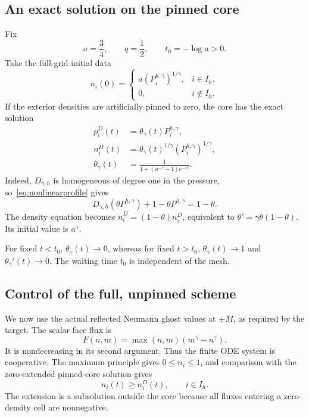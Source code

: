 \documentclass[11pt,a4paper]{article}
\theoremstyle{remark}
\begin{document}
\subsection{An exact solution on the pinned core}

Fix
\[
 a=\frac34,\qquad q=\frac12,\qquad t_0=-\log a>0.
\]
Take the full-grid initial data
\begin{equation}\label{eq:abinitial}
 n_i(0)=
 \begin{cases}
 a(P_i^{h,\gamma})^{1/\gamma},&i\in I_h,\\
 0,&i\notin I_h.
 \end{cases}
\end{equation}
If the exterior densities are artificially pinned to zero, the core has the exact solution
\begin{align}
 p_i^D(t)&=\theta_\gamma(t)P_i^{h,\gamma},\label{eq:corepressure}\\
 n_i^D(t)&=\theta_\gamma(t)^{1/\gamma}(P_i^{h,\gamma})^{1/\gamma},\label{eq:coredensity}\\
 \theta_\gamma(t)&=\frac1{1+(a^{-\gamma}-1)e^{-\gamma t}}.
 \label{eq:theta}
\end{align}
Indeed, $D_{\gamma,h}$ is homogeneous of degree one in the pressure, so~\eqref{eq:nonlinearprofile} gives
\[
 D_{\gamma,h}(\theta P^{h,\gamma})+1-\theta P^{h,\gamma}=1-\theta.
\]
The density equation becomes $\dot n_i^D=(1-\theta)n_i^D$, equivalent to $\theta'=\gamma\theta(1-\theta)$. Its initial value is $a^\gamma$.

For fixed $t<t_0$, $\theta_\gamma(t)\to0$, whereas for fixed $t>t_0$, $\theta_\gamma(t)\to1$ and $\theta_\gamma'(t)\to0$. The waiting time $t_0$ is independent of the mesh.

\subsection{Control of the full, unpinned scheme}

We now use the actual reflected Neumann ghost values at $\pm M$, as required by the target. The scalar face flux is
\[
 F(n,m)=\max(n,m)(m^\gamma-n^\gamma).
\]
It is nondecreasing in its second argument. Thus the finite ODE system is cooperative. The maximum principle gives $0\le n_i\le1$, and comparison with the zero-extended pinned-core solution gives
\begin{equation}\label{eq:comparison}
 n_i(t)\ge n_i^D(t),\qquad i\in I_h.
\end{equation}
The extension is a subsolution outside the core because all fluxes entering a zero-density cell are nonnegative.
\end{document}

